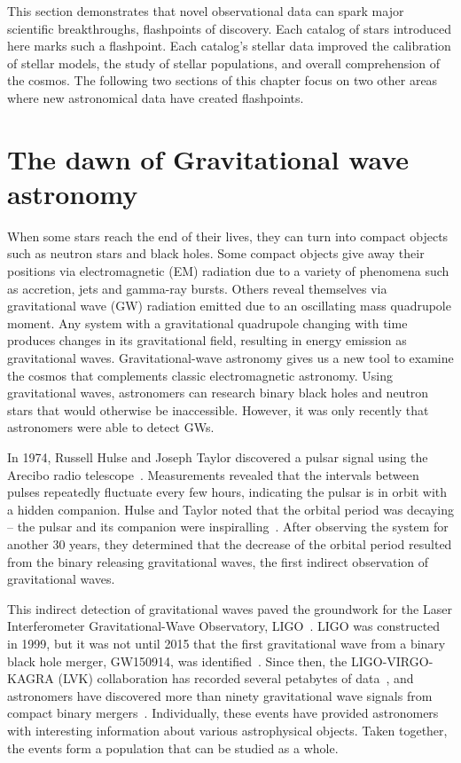 This section demonstrates that novel observational data can spark major scientific breakthroughs, flashpoints of discovery. 
Each catalog of stars introduced here marks such a flashpoint. 
Each catalog's stellar data improved the calibration of stellar models, the study of stellar populations, and  overall comprehension of the cosmos. 
The following two sections of this chapter focus on two other areas where new astronomical data have created flashpoints. 

\section{The dawn of Gravitational wave astronomy}

When some stars reach the end of their lives, they can turn into compact objects such as neutron stars and black holes. 
Some compact objects give away their positions via electromagnetic (EM) radiation due to a variety of phenomena such as accretion, jets and gamma-ray bursts. 
Others reveal themselves via gravitational wave (GW) radiation emitted due to an oscillating mass quadrupole moment.
Any system with a gravitational quadrupole changing with time produces changes in its gravitational field, resulting in energy emission as gravitational waves.
Gravitational-wave astronomy gives us a new tool to examine the cosmos that complements classic electromagnetic astronomy.
Using gravitational waves, astronomers can research binary black holes and neutron stars that would otherwise be inaccessible.
However, it was only recently that astronomers were able to detect GWs. 

In 1974, Russell Hulse and Joseph Taylor discovered a pulsar signal using the Arecibo radio telescope~\cite{Hulse:1975:ApJL}. %
Measurements revealed that the intervals between pulses repeatedly fluctuate every few hours, indicating the pulsar is in orbit with a hidden companion.
Hulse and Taylor noted that the orbital period was decaying -- the pulsar and its companion were inspiralling~\cite{Hulse:1975:ApJL}.
After observing the system for another 30 years, they determined that the decrease of the orbital period resulted from the binary releasing gravitational waves, the first indirect observation of gravitational waves.

This indirect detection of gravitational waves paved the groundwork for the Laser Interferometer Gravitational-Wave Observatory, LIGO~\cite{Barish:1999:PhT}. 
LIGO was constructed in 1999, but it was not until 2015 that the first gravitational wave from a binary black hole merger, GW150914, was identified~\cite{abbott2016observation}.
Since then, the LIGO-VIRGO-KAGRA (LVK) collaboration has recorded several petabytes of data~\cite{ligoData}, and astronomers have discovered more than ninety gravitational wave signals from compact binary mergers~\cite{abbott2019gwtc, gwtc2, gwtc3}.
Individually, these events have provided astronomers with interesting information about various astrophysical objects. 
Taken together, the events form a population that can be studied as a whole. 

